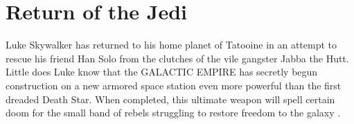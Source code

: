 \chapter{Return of the Jedi}
Luke Skywalker has returned to his home planet of Tatooine 
in an attempt to rescue his friend Han Solo from the 
clutches of the vile gangster Jabba the Hutt.  Little does 
Luke know that the GALACTIC EMPIRE has secretly begun 
construction on a new armored space station even more 
powerful than the first dreaded Death Star.  When completed, 
this ultimate weapon will spell certain doom for the small 
band of rebels struggling to restore freedom to the galaxy \cite{bib_hutt83, bib_solo83, bib_skywalker83, bib_boba83}.

\lipsum[1-10]
